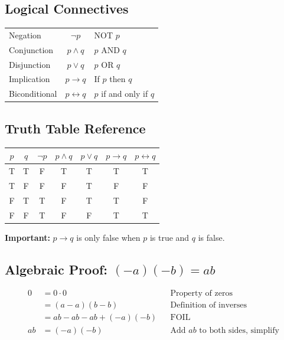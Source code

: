 \documentclass{article}
\begin{document}
\subsection*{Logical Connectives}

\begin{tabular}{lcl}
Negation & $\neg p$ & NOT $p$ \\
Conjunction & $p \land q$ & $p$ AND $q$ \\
Disjunction & $p \lor q$ & $p$ OR $q$ \\
Implication & $p \to q$ & If $p$ then $q$ \\
Biconditional & $p \leftrightarrow q$ & $p$ if and only if $q$
\end{tabular}

\subsection*{Truth Table Reference}

\begin{tabular}{|c|c|c|c|c|c|c|}
\hline
$p$ & $q$ & $\neg p$ & $p \land q$ & $p \lor q$ & $p \to q$ & $p \leftrightarrow q$ \\
\hline
T & T & F & T & T & T & T \\
T & F & F & F & T & F & F \\
F & T & T & F & T & T & F \\
F & F & T & F & F & T & T \\
\hline
\end{tabular}

\medbreak
\textbf{Important:} $p \to q$ is only false when $p$ is true and $q$ is false.

\subsection*{Algebraic Proof: $(-a)(-b) = ab$}

\begin{align*}
0 &= 0 \cdot 0 & &\text{Property of zeros} \\
  &= (a - a)(b - b) & &\text{Definition of inverses} \\
  &= ab - ab - ab + (-a)(-b) & &\text{FOIL} \\
ab &= (-a)(-b) & &\text{Add $ab$ to both sides, simplify}
\end{align*}

\end{document}
